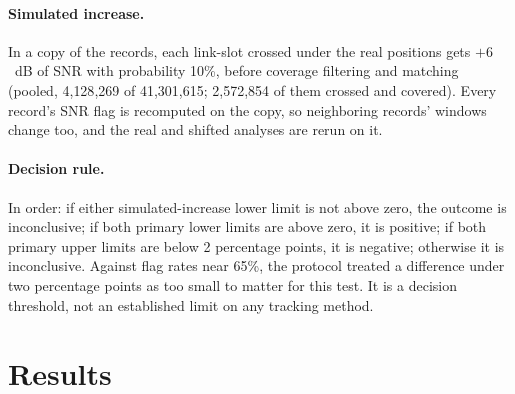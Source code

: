 \documentclass[11pt]{article}
\begin{document}
\paragraph{Simulated increase.} In a copy of the records, each link-slot crossed under the real positions gets $+6$~dB of SNR with probability 10\%, before coverage filtering and matching (pooled, 4{,}128{,}269 of 41{,}301{,}615; 2{,}572{,}854 of them crossed and covered). Every record's SNR flag is recomputed on the copy, so neighboring records' windows change too, and the real and shifted analyses are rerun on it.

\paragraph{Decision rule.} In order: if either simulated-increase lower limit is not above zero, the outcome is inconclusive; if both primary lower limits are above zero, it is positive; if both primary upper limits are below 2 percentage points, it is negative; otherwise it is inconclusive. Against flag rates near 65\%, the protocol treated a difference under two percentage points as too small to matter for this test. It is a decision threshold, not an established limit on any tracking method.

\section{Results}\label{sec:results}
\end{document}
